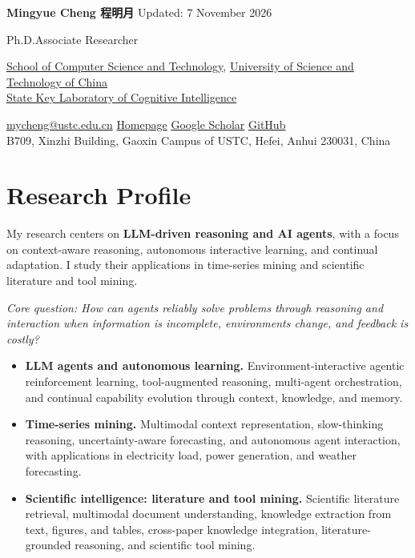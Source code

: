 \documentclass[UTF8,fontset=fandol,scheme=plain,11pt,a4paper]{ctexart}
\begin{document}
\begingroup
\setlength{\parskip}{0pt}
\raggedright
{\fontsize{24}{28}\selectfont\bfseries Mingyue Cheng\enspace
 {\fontsize{11}{14}\selectfont\mdseries\color{muted}程明月}}\hfill
{\fontsize{9}{12}\selectfont\color{muted}Updated: 7 November 2026}\par
\vspace{3pt}
{\fontsize{11}{14}\selectfont Ph.D.\enspace\textperiodcentered\enspace Associate Researcher}\par
\vspace{5pt}
{\fontsize{10.5}{13.5}\selectfont
\href{https://cs.ustc.edu.cn/}{School of Computer Science and Technology}, \href{https://www.ustc.edu.cn/}{University of Science and Technology of China}\\
\href{https://cogskl.iflytek.com/}{State Key Laboratory of Cognitive Intelligence}\par}
\vspace{5pt}
{\fontsize{9.5}{12.5}\selectfont
\href{mailto:mycheng@ustc.edu.cn}{mycheng@ustc.edu.cn}
\enspace\textperiodcentered\enspace\href{https://mingyue-cheng.github.io/}{Homepage}
\enspace\textperiodcentered\enspace\href{https://scholar.google.com/citations?user=74IhSx8AAAAJ}{Google Scholar}
\enspace\textperiodcentered\enspace\href{https://github.com/Mingyue-Cheng/}{GitHub}\\
B709, Xinzhi Building, Gaoxin Campus of USTC, Hefei, Anhui 230031, China
\par}
\endgroup
\vspace{5pt}
\section{Research Profile}
My research centers on \textbf{LLM-driven reasoning and AI agents}, with a focus on context-aware reasoning, autonomous interactive learning, and continual adaptation. I study their applications in time-series mining and scientific literature and tool mining.

\textit{Core question: How can agents reliably solve problems through reasoning and interaction when information is incomplete, environments change, and feedback is costly?}
\begin{itemize}
\item \textbf{LLM agents and autonomous learning.}
Environment-interactive agentic reinforcement learning, tool-augmented reasoning, multi-agent orchestration, and continual capability evolution through context, knowledge, and memory.
\item \textbf{Time-series mining.}
Multimodal context representation, slow-thinking reasoning, uncertainty-aware forecasting, and autonomous agent interaction, with applications in electricity load, power generation, and weather forecasting.
\item \textbf{Scientific intelligence: literature and tool mining.}
Scientific literature retrieval, multimodal document understanding, knowledge extraction from text, figures, and tables, cross-paper knowledge integration, literature-grounded reasoning, and scientific tool mining.
\end{itemize}
\end{document}
